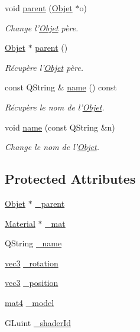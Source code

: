 \begin{DoxyCompactItemize}
void \hyperlink{class_objet_a95e63a98dc9dc485fe874df30f2069ee}{parent} (\hyperlink{class_objet}{Objet} $\ast$o)
\begin{DoxyCompactList}\small\item\em Change l'\hyperlink{class_objet}{Objet} père. \end{DoxyCompactList}\item 
\hyperlink{class_objet}{Objet} $\ast$ \hyperlink{class_objet_aaa3c3290e5bb742363263600fcdb3e5e}{parent} ()
\begin{DoxyCompactList}\small\item\em Récupère l'\hyperlink{class_objet}{Objet} père. \end{DoxyCompactList}\item 
const Q\+String \& \hyperlink{class_objet_a4a702c189bedcbf1e65da6aec72c8e44}{name} () const 
\begin{DoxyCompactList}\small\item\em Récupère le nom de l'\hyperlink{class_objet}{Objet}. \end{DoxyCompactList}\item 
void \hyperlink{class_objet_a9fcc9af481f4e13f46ab7d1b40cf91fc}{name} (const Q\+String \&n)
\begin{DoxyCompactList}\small\item\em Change le nom de l'\hyperlink{class_objet}{Objet}. \end{DoxyCompactList}\end{DoxyCompactItemize}
\subsection*{Protected Attributes}
\begin{DoxyCompactItemize}
\item 
\hyperlink{class_objet}{Objet} $\ast$ \hyperlink{class_objet_a91c5a50011c3fe9233a645aa767a275f}{\+\_\+parent}
\item 
\hyperlink{class_material}{Material} $\ast$ \hyperlink{class_objet_aefea82be8c63504190ac63d5e44ff61a}{\+\_\+mat}
\item 
Q\+String \hyperlink{class_objet_ac19f568a794dd9387386ee71914a868e}{\+\_\+name}
\item 
\hyperlink{structvec3}{vec3} \hyperlink{class_objet_a1d8675e88cc98ba740292af1421c2ee1}{\+\_\+rotation}
\item 
\hyperlink{structvec3}{vec3} \hyperlink{class_objet_a6c1a10fa5f4c5cd0e0617d93f42d927b}{\+\_\+position}
\item 
\hyperlink{structmat4}{mat4} \hyperlink{class_objet_a1963cca59f62c7a6f69a9c2c461ad9ea}{\+\_\+model}
\item 
G\+Luint \hyperlink{class_objet_af0d545a506dbfa377c8ca5a499fdf755}{\+\_\+shader\+Id}
\end{DoxyCompactItemize}
